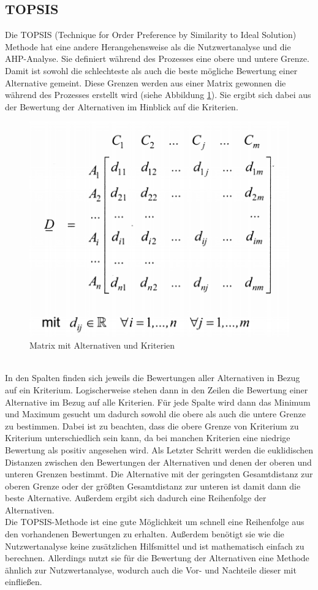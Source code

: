 \subsection{TOPSIS}
Die TOPSIS (Technique for Order Preference by Similarity to Ideal Solution) Methode hat eine andere Herangehensweise als die Nutzwertanalyse und die AHP-Analyse. Sie definiert während des Prozesses eine obere und untere Grenze. Damit ist sowohl die schlechteste als auch die beste mögliche Bewertung einer Alternative gemeint. Diese Grenzen werden aus einer Matrix gewonnen die während des Prozesses erstellt wird (siehe Abbildung \ref{img:topsis}). Sie ergibt sich dabei aus der Bewertung der Alternativen im Hinblick auf die Kriterien.
\begin{figure}[h!]
	\centering
	\includegraphics[scale = 0.7]{img/TOPSIS.png}
	\caption{Matrix mit Alternativen und Kriterien}
	\label{img:topsis}
\end{figure}\\
In den Spalten finden sich jeweils die Bewertungen aller Alternativen in Bezug auf ein Kriterium. Logischerweise stehen dann in den Zeilen die Bewertung einer Alternative im Bezug auf alle Kriterien. Für jede Spalte wird dann das Minimum und Maximum gesucht um dadurch sowohl die obere als auch die untere Grenze zu bestimmen. Dabei ist zu beachten, dass die obere Grenze von Kriterium zu Kriterium unterschiedlich sein kann, da bei manchen Kriterien eine niedrige Bewertung als positiv angesehen wird. Als Letzter Schritt werden die euklidischen Distanzen zwischen den Bewertungen der Alternativen und denen der oberen und unteren Grenzen bestimmt. Die Alternative mit der geringsten Gesamtdistanz zur oberen Grenze oder der größten Gesamtdistanz zur unteren ist damit dann die beste Alternative. Außerdem ergibt sich dadurch eine Reihenfolge der Alternativen.\\
Die TOPSIS-Methode ist eine gute Möglichkeit um schnell eine Reihenfolge aus den vorhandenen Bewertungen zu erhalten. Außerdem benötigt sie wie die Nutzwertanalyse keine zusätzlichen Hilfsmittel und ist mathematisch einfach zu berechnen. Allerdings nutzt sie für die Bewertung der Alternativen eine Methode ähnlich zur Nutzwertanalyse, wodurch auch die Vor- und Nachteile dieser mit einfließen.
